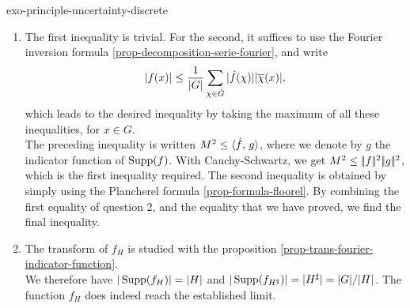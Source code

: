 \begin{correction}{exo-principle-uncertainty-discrete}
\begin{enumerate}
  The matrix of the system is Vandermonde, it is invertible, which is absurd because the $ f(a_i) $ are not all zero. In the general case, if we suppose that $ p $ consecutive inputs of $ \wh{f} $ are zero, we come back to the previous case by performing a translation on $ \wh{f} $ (which amounts to a modulation on $ f $ and do not change the support). \\It is now easy to see that this implies the principle of uncertainty. Suppose first that $ p | N $. We partition $ \{0, \ldots, \, n-1\} $ into $ n/p $ blocks of size $ p $. From what we have just shown, on each of these blocks, $ \wh{f} $ cannot be zero. Thus, each block contains at least one $ k $ such that $ \wh{f} (k) \neq 0 $ and $ | \Supp (\wh{f}) | \geq n/p $. \\If $ p $ does not divide $ n $, we denote by $ d = \left\lceil n/p \right\rceil $. It is impossible to distribute less than $ d $ elements among $ n $ places on a circle without leaving two elements with a hole of $ p $ places between them. Consequently, we have $ | \Supp (\wh{f}) | \geq d $ and $ | \Supp (f) | \times | \Supp (\wh{f}) | \geq dp \geq n $.
\item The first inequality is trivial. For the second, it suffices to use the Fourier inversion formula \ref{prop-decomposition-serie-fourier}, and write
\begin{equation*}
| f(x) | \leq \frac{1}{|G|} \sum_{\chi \in \hat{G}}{| \hat{f} (\chi) | | \overline{\chi} (x) |},
\end{equation*}
which leads to the desired inequality by taking the maximum of all these inequalities, for $ x \in G $. \\The preceding inequality is written $ M^2 \leq \langle \hat{f},\,g\rangle $, where we denote by $ g $ the indicator function of $ \operatorname{Supp} (f) $. With Cauchy-Schwartz, we get $ M^2 \leq |\!| f |\!|^2 |\!| g |\!|^2 $, which is the first inequality required. The second inequality is obtained by simply using the Plancherel formula \ref{prop-formula-floorel}. By combining the first equality of question 2, and the equality that we have proved, we find the final inequality.
\item The transform of $ f_H $ is studied with the proposition \ref{prop-trans-fourier-indicator-function}. \\We therefore have $ | \operatorname{Supp} (f_H) | = | H | $ and $ | \operatorname{Supp} (f_{H^\sharp}) | = | H^\sharp | = |G|/| H | $. The function $ f_H $ does indeed reach the established limit.
\end{enumerate}
\end{correction}


